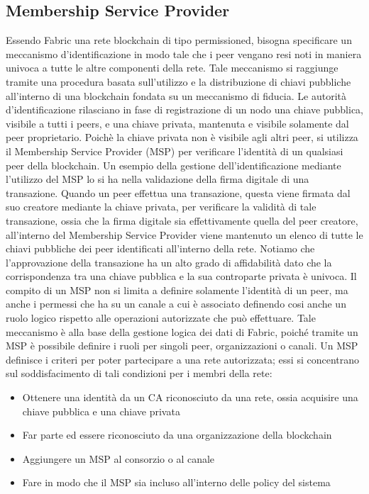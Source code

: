 \subsection{Membership Service Provider}
Essendo Fabric una rete blockchain di tipo permissioned, bisogna specificare un meccanismo d'identificazione in modo tale che i peer vengano resi noti in maniera univoca a tutte le altre componenti della rete. Tale meccanismo si raggiunge tramite una procedura basata sull'utilizzo e la distribuzione di chiavi pubbliche all'interno di una blockchain fondata su un meccanismo di fiducia. Le autorità d'identificazione rilasciano in fase di registrazione di un nodo una chiave pubblica, visibile a tutti i peers, e una chiave privata, mantenuta e visibile solamente dal peer proprietario. Poichè la chiave privata non è visibile agli altri peer, si utilizza il Membership Service Provider (MSP) per verificare l'identità di un qualsiasi peer della blockchain. Un esempio della gestione dell'identificazione mediante l'utilizzo del MSP lo si ha nella validazione della firma digitale di una transazione. Quando un peer effettua una transazione, questa viene firmata dal suo creatore mediante la chiave privata, per verificare la validità di tale transazione, ossia che la firma digitale sia effettivamente quella del peer creatore, all'interno del Membership Service Provider viene mantenuto un elenco di tutte le chiavi pubbliche dei peer identificati all'interno della rete.  Notiamo che l'approvazione della transazione ha un alto grado di affidabilità dato che la corrispondenza tra una chiave pubblica e la sua controparte privata è univoca. Il compito di un MSP non si limita a definire solamente l'identità di un peer, ma anche i permessi che ha su un canale a cui è associato definendo cosi anche un ruolo logico rispetto alle operazioni autorizzate che può effettuare. Tale meccanismo è alla base della gestione logica dei dati di Fabric, poiché tramite un MSP è possibile definire i ruoli per singoli peer, organizzazioni o canali. Un MSP definisce i criteri per poter partecipare a una rete autorizzata; essi si concentrano sul soddisfacimento di tali condizioni per i membri della rete:
\newpage
\begin{itemize}
    \item Ottenere una identità da un CA riconosciuto da una rete, ossia acquisire una chiave pubblica e una chiave privata
    \item Far parte ed essere riconosciuto da una organizzazione della blockchain
    \item Aggiungere un MSP al consorzio o al canale
    \item Fare in modo che il MSP sia incluso all'interno delle policy del sistema
\end{itemize}
